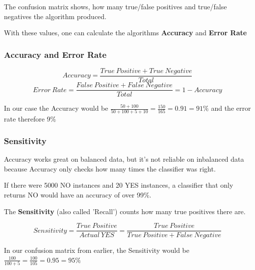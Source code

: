\documentclass[11pt]{article}
\begin{document}
\vspace{10px}

The confusion matrix shows, how many true/false positives and true/false negatives the algorithm produced.

With these values, one can calculate the algorithms \textbf{Accuracy} and \textbf{Error Rate}

\subsubsection{Accuracy and Error Rate}

\begin{equation}
    Accuracy = \frac{True\ Positive + True\ Negative}{Total}
\end{equation}
\vspace{10px}
\begin{equation}
    Error\ Rate = \frac{False\ Positive + False\ Negative}{Total} = 1 - Accuracy
\end{equation}

\vspace{10px}

In our case the Accuracy would be $\frac{50+100}{50+100+5+10} = \frac{150}{165} = 0.91 = 91\%$ and the error rate therefore 9\%

\newpage

\subsubsection{Sensitivity}

Accuracy works great on balanced data, but it's not reliable on inbalanced data because Accuracy only checks how many times the classifier was right.

If there were 5000 NO instances and 20 YES instances, a classifier that only returns NO would have an accuracy of over 99\%.

\vspace{10px}

\noindent The \textbf{Sensitivity} (also called 'Recall') counts how many true positives there are.

\begin{equation}
    Sensitivity = \frac{True\ Positive}{Actual\ YES} = \frac{True\ Positive}{True\ Positive + False\ Negative}
\end{equation}

\vspace{10px}

In our confusion matrix from earlier, the Sensitivity would be $\frac{100}{100 + 5} = \frac{100}{105} = 0.95 = 95\%$
\end{document}
